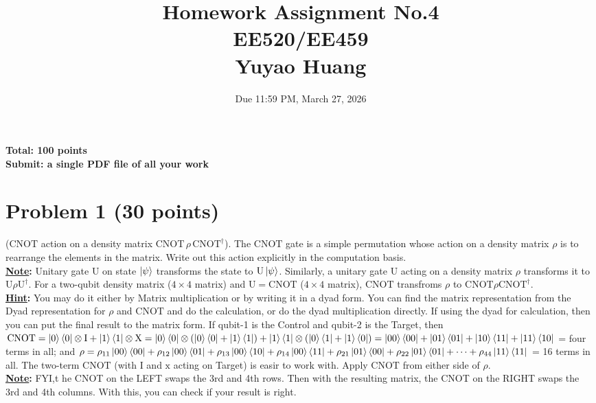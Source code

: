 \documentclass[11pt]{article}
\title{Homework Assignment No.4 \\ EE520/EE459 \\ Yuyao Huang}
\date{Due 11:59 PM, March 27, 2026}
\begin{document}
\maketitle

\textbf{Total: 100 points} \\
\textbf{Submit: a single PDF file of all your work}

\section*{Problem 1 (30 points)}
(\(\mathrm{CNOT}\) action on a density matrix \(\mathrm{CNOT}\,\rho\,\mathrm{CNOT}^\dagger\)). The \(\mathrm{CNOT}\) gate is a simple permutation whose action on a density matrix \(\rho\) is to rearrange the elements in the matrix. Write out this action explicitly in the computation basis. \\
\textbf{\underline{Note}:} Unitary gate U on state \(\ket{\psi}\) transforms the state to \(\mathrm{U}\ket{\psi}\). Similarly, a unitary gate \(\mathrm{U}\) acting on a density matrix \(\rho\) transforms it to \(\mathrm{U}\rho\mathrm{U}^\dagger\). For a two-qubit density matrix (\(4 \times 4\) matrix) and \(\mathrm{U}=\mathrm{CNOT}\) (\(4 \times 4\) matrix), \(\mathrm{CNOT}\) transfroms \(\rho\) to \(\mathrm{CNOT}\rho\mathrm{CNOT}^\dagger\).\\
\textbf{\underline{Hint}:} You may do it either by Matrix multiplication or by writing it in a dyad form. You can find the matrix representation from the Dyad representation for \(\rho\) and \(\mathrm{CNOT}\) and do the calculation, or do the dyad multiplication directly.  If using the dyad for calculation, then you can put the final result to the matrix form.   If qubit-1 is the Control and qubit-2 is the Target, then \(\mathrm{CNOT} = \ket{0}\bra{0} \otimes \mathrm{I} + \ket{1}\bra{1} \otimes \mathrm{X} = \ket{0}\bra{0} \otimes \left(\ket{0}\bra{0} + \ket{1}\bra{1}\right) + \ket{1}\bra{1} \otimes \left(\ket{0}\bra{1} + \ket{1}\bra{0}\right) = \ket{00}\bra{00} + \ket{01}\bra{01} + \ket{10}\bra{11} + \ket{11}\bra{10}\) = four terms in all; and \(\rho = \rho_{11}\ket{00}\bra{00} + \rho_{12}\ket{00}\bra{01} + \rho_{13}\ket{00}\bra{10} + \rho_{14}\ket{00}\bra{11} + \rho_{21}\ket{01}\bra{00} + \rho_{22}\ket{01}\bra{01} + \cdots + \rho_{44}\ket{11}\bra{11}\) = 16 terms in all. The two-term \(\mathrm{CNOT}\) (with \(\mathrm{I}\) and \(\mathrm{x}\) acting on Target) is easir to work with. Apply \(\mathrm{CNOT}\) from either side of \(\rho\). \\
\textbf{\underline{Note}:} FYI,t he CNOT on the LEFT swaps the 3rd and 4th rows.  Then with the resulting matrix, the CNOT on the RIGHT swaps the 3rd and 4th columns.  With this, you can check if your result is right. 
 
\end{document}
